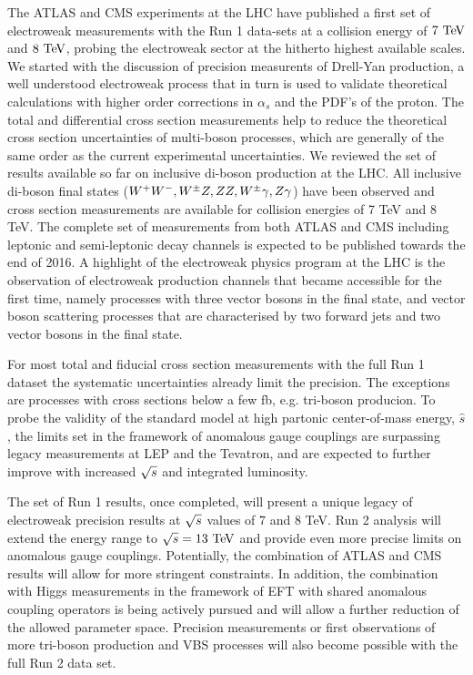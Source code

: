 The ATLAS and CMS experiments at the LHC have published a first set of electroweak measurements with the 
Run 1 data-sets at a collision energy of $7\TeV$ and $8\TeV$,
probing the electroweak sector at the hitherto highest available scales.
We started with the discussion of precision measurents of Drell-Yan production, a well understood electroweak
process that in turn is used to validate theoretical calculations with higher order corrections in
$\alpha_s$ and the PDF's of the proton. The total and differential cross section measurements help to 
reduce the theoretical cross section uncertainties of multi-boson processes, which are generally of the same order as the current
experimental uncertainties.  
We reviewed the set of results available so far on inclusive di-boson production at the LHC. All inclusive di-boson final states
($W^+W^-,W^{\pm}Z,ZZ,W^{\pm}\gamma,Z\gamma$) have been observed and cross section measurements are available for collision energies of 7 TeV and 8 TeV. 
The complete set of measurements from both ATLAS and CMS including leptonic and semi-leptonic decay channels
is expected to be published towards the end of 2016.
A highlight of the electroweak physics program at the LHC is the observation of electroweak production channels 
that became accessible for the first time, namely processes with 
three vector bosons in the final state, and vector boson scattering processes that are 
characterised by two forward jets and two vector bosons in the final state.

For most total and fiducial cross section measurements with the full Run 1 dataset the systematic uncertainties 
already limit the precision. The exceptions are processes with cross sections below a few fb, e.g. tri-boson producion. 
To probe the validity of the standard model at high partonic center-of-mass energy, $\hat{s}$, the limits
set in the framework of anomalous gauge couplings are surpassing legacy measurements at LEP and the Tevatron,
and are expected to further improve with increased $\sqrt{s}$ and integrated luminosity. 

The set of Run 1 results, once completed, will present a unique legacy of electroweak precision results at 
$\sqrt{s}$ values of 7 and 8 TeV.
Run 2 analysis will extend the energy range to $\rts=13\TeV$ 
and provide even more precise limits on anomalous gauge couplings. Potentially, 
the combination of ATLAS and CMS results will allow for more stringent constraints. In addition, the combination
with Higgs measurements in the framework of EFT with shared anomalous coupling operators is being 
actively pursued and will allow a further reduction of the allowed parameter space. 
Precision measurements or first observations of more tri-boson production and VBS processes will also become possible with the full 
Run 2 data set. 


 
